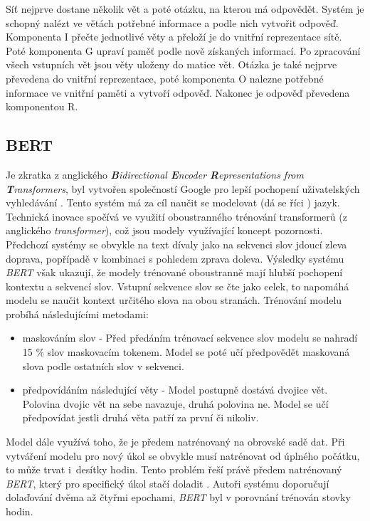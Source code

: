 Síť nejprve dostane několik vět a poté otázku, na kterou má odpovědět. Systém je schopný nalézt ve větách potřebné informace a podle nich vytvořit odpověď. Komponenta I přečte jednotlivé věty a přeloží je do vnitřní reprezentace sítě. Poté komponenta G upraví paměť podle nově získaných informací. Po zpracování všech vstupních vět jsou věty uloženy do matice vět. Otázka je také nejprve převedena do vnitřní reprezentace, poté komponenta O nalezne potřebné informace ve vnitřní paměti a vytvoří odpověď. Nakonec je odpověď převedena komponentou R.


\subsection{BERT}

Je zkratka z anglického \emph{\textbf{B}idirectional \textbf{E}ncoder \textbf{R}epresentations from \textbf{T}ransformers}, byl vytvořen společností Google pro lepší pochopení uživatelských vyhledávání \cite{bert}. Tento systém má za cíl naučit se modelovat (dá se říci ) jazyk. Technická inovace spočívá ve využití oboustranného trénování transformerů (z anglického \emph{transformer}), což jsou modely využívající koncept pozornosti. Předchozí systémy se obvykle na text dívaly jako na sekvenci slov jdoucí zleva doprava, popřípadě v kombinaci s pohledem zprava doleva. Výsledky systému \emph{BERT} však ukazují, že modely trénované oboustranně mají hlubší pochopení kontextu a sekvencí slov. Vstupní sekvence slov se čte jako celek, to napomáhá modelu se naučit kontext určitého slova na obou stranách. Trénování modelu probíhá následujícími metodami:
\begin{itemize}
    \item maskováním slov - Před předáním trénovací sekvence slov modelu se nahradí 15 \% slov maskovacím tokenem. Model se poté učí předpovědět maskovaná slova podle ostatních slov v sekvenci. 
    \item předpovídáním následující věty - Model postupně dostává dvojice vět. Polovina dvojic vět na sebe navazuje, druhá polovina ne. Model se učí předpovídat jestli druhá věta patří za první či nikoliv. 
\end{itemize}

Model dále využívá toho, že je předem natrénovaný na obrovské sadě dat. Při vytváření modelu pro nový úkol se obvykle musí natrénovat od úplného počátku, to může trvat i~desítky hodin. Tento problém řeší právě předem natrénovaný \emph{BERT}, který pro specifický úkol stačí doladit \cite{finetune}. Autoři systému doporučují dolaďování dvěma až čtyřmi epochami, \emph{BERT} byl v porovnání trénován stovky hodin.    

